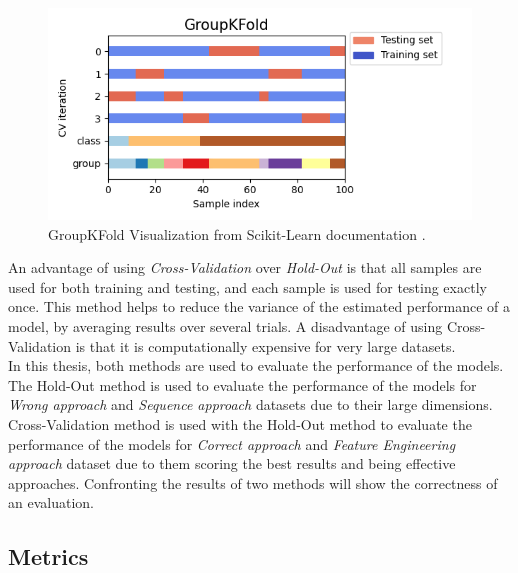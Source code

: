 \begin{itemize}
                    \begin{figure}[H]
                        \centering
                        \includegraphics[width=1.0\textwidth]{../src/resources/images/other/groupkfold.png}
                        \caption{
                          GroupKFold Visualization from Scikit-Learn documentation \cite{scikit-learn}.
                        }
                        \label{fig:groupkfold}
                    \end{figure}
                \end{itemize}
                
        An advantage of using \textit{Cross-Validation} over \textit{Hold-Out} is that all samples are used for both training and testing, and each sample is used for testing exactly once. This method helps to reduce the variance of the estimated performance of a model, by averaging results over several trials. A disadvantage of using Cross-Validation is that it is computationally expensive for very large datasets. \\ 

        In this thesis, both methods are used to evaluate the performance of the models. The Hold-Out method is used to evaluate the performance of the models for \textit{Wrong approach} and \textit{Sequence approach} datasets due to their large dimensions. Cross-Validation method is used with the Hold-Out method to evaluate the performance of the models for \textit{Correct approach} and \textit{Feature Engineering approach} dataset due to them scoring the best results and being effective approaches. Confronting the results of two methods will show the correctness of an evaluation. \\
        
        \subsection{Metrics}


